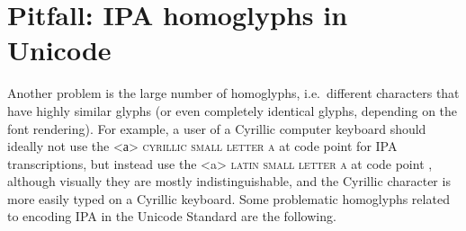 \section{Pitfall: IPA homoglyphs in Unicode}
\label{pitfall-ipa-homoglyphs}

Another problem is the large number of homoglyphs, i.e.~different characters
that have highly similar glyphs (or even completely identical glyphs, depending
on the font rendering). For example, a user of a Cyrillic computer keyboard
should ideally not use the <а> \textsc{cyrillic small letter a} at code point
 for IPA transcriptions, but instead use the <a> \textsc{latin small
letter a} at code point , although visually they are mostly
indistinguishable, and the Cyrillic character is more easily typed on a Cyrillic
keyboard. Some problematic homoglyphs related to encoding IPA in the Unicode Standard are 
the following.
